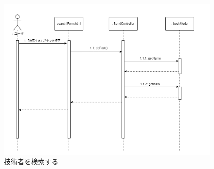 \documentclass[dvipdfmx]{jsarticle}
\begin{document}
    \begin{figure}[H]
        \begin{center}
            \caption*{技術者を検索する}
            \includegraphics[scale=0.6,clip]{pictures/sequence-graph/searchBook.png}
        \end{center}
    \end{figure}
\end{document}
